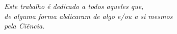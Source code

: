 \vspace*{\fill}
   \centering
   \noindent
   \textit{Este trabalho é dedicado a todos aqueles que,\\
   de alguma forma abdicaram de algo e/ou a si mesmos\\
   pela Ciência.} \vspace*{\fill}
